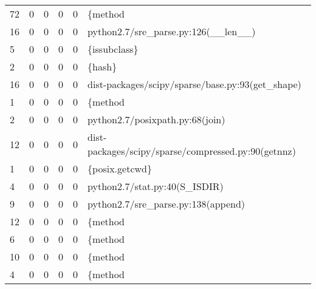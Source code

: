 \begin{tabular}{lrrrrl}
 72       &     0     &     0     &     0     &     0     & \{method                                                                  \\
 16       &     0     &     0     &     0     &     0     & python2.7/sre\_parse.py:126(\_\_len\_\_)                                      \\
 5        &     0     &     0     &     0     &     0     & \{issubclass\}                                                             \\
 2        &     0     &     0     &     0     &     0     & \{hash\}                                                                   \\
 16       &     0     &     0     &     0     &     0     & dist-packages/scipy/sparse/base.py:93(get\_shape)                         \\
 1        &     0     &     0     &     0     &     0     & \{method                                                                  \\
 2        &     0     &     0     &     0     &     0     & python2.7/posixpath.py:68(join)                                          \\
 12       &     0     &     0     &     0     &     0     & dist-packages/scipy/sparse/compressed.py:90(getnnz)                      \\
 1        &     0     &     0     &     0     &     0     & \{posix.getcwd\}                                                           \\
 4        &     0     &     0     &     0     &     0     & python2.7/stat.py:40(S\_ISDIR)                                            \\
 9        &     0     &     0     &     0     &     0     & python2.7/sre\_parse.py:138(append)                                       \\
 12       &     0     &     0     &     0     &     0     & \{method                                                                  \\
 6        &     0     &     0     &     0     &     0     & \{method                                                                  \\
 10       &     0     &     0     &     0     &     0     & \{method                                                                  \\
 4        &     0     &     0     &     0     &     0     & \{method                                                                  \\

\end{tabular}
